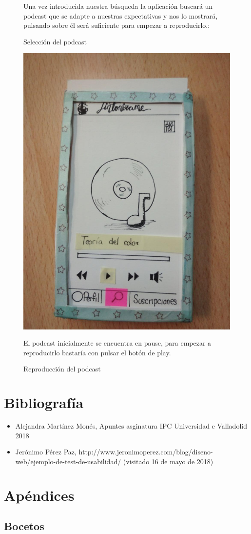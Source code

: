 \documentclass[a4paper]{article}
\begin{document}
\begin{center}
\begin{figure}[H]
\caption{Selección del podcast}
\label{fig:t3-17}
Una vez introducida nuestra búsqueda la aplicación buscará un podcast que se adapte a nuestras expectativas y nos lo mostrará, pulsando sobre él será suficiente para empezar a reproducirlo.:
\end{figure}
\begin{figure}[H]
\centering
\includegraphics[width=0.4\columnwidth]{T3-1.jpg}
\caption{Reproducción del podcast}
\label{fig:t3-19}
El podcast inicialmente se encuentra en pause, para empezar a reproducirlo bastaría con pulsar el botón de play.
\end{figure}
\end{center}


\section{Bibliografía}

\begin{itemize}
\item Alejandra Martínez Monés, Apuntes asginatura IPC Universidad e Valladolid 2018
\item Jerónimo Pérez Paz, http://www.jeronimoperez.com/blog/diseno-web/ejemplo-de-test-de-usabilidad/ (visitado 16 de mayo de 2018)
\end{itemize}


\appendix

\section{Apéndices}

\subsection{Bocetos}
\label{bocetos}
\end{document}
